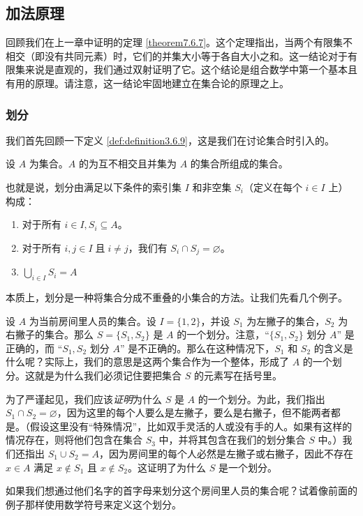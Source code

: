 
\subsection{加法原理}

回顾我们在上一章中证明的定理 \ref{theorem7.6.7}。这个定理指出，当两个有限集不相交（即没有共同元素）时，它们的并集大小等于各自大小之和。这一结论对于有限集来说是直观的，我们通过双射证明了它。这个结论是组合数学中第一个基本且有用的原理。请注意，这一结论牢固地建立在集合论的原理之上。

\subsubsection*{划分}

我们首先回顾一下定义 \ref{def:definition3.6.9}，这是我们在讨论集合时引入的。

\begin{definition}
    设 $A$ 为集合。$A$ 的为互不相交且并集为 $A$ 的集合所组成的集合。

    也就是说，划分由满足以下条件的索引集 $I$ 和非空集 $S_i$（定义在每个 $i \in I$ 上）构成：
    \begin{enumerate}[label=(\arabic*)]
        \item 对于所有 $i \in I, S_i \subseteq A$。
        \item 对于所有 $i, j \in I \;\text{且}\; i \ne j$，我们有 $S_i \cap S_j = \varnothing$。
        \item $\displaystyle \bigcup_{i \in I} S_i = A$
    \end{enumerate}
\end{definition}
本质上，划分是一种将集合分成不重叠的小集合的方法。让我们先看几个例子。\\

\begin{example}
    设 $A$ 为当前房间里人员的集合。设 $I = \{1, 2\}$，并设 $S_1$ 为左撇子的集合，$S_2$ 为右撇子的集合。那么 $S = \{S_1, S_2\}$ 是 $A$ 的一个划分。注意，``$\{S_1, S_2\}$ 划分 $A$'' 是正确的，而 ``$S_1, S_2$ 划分 $A$'' 是不正确的。那么在这种情况下，$S_1$ 和 $S_2$ 的含义是什么呢？实际上，我们的意思是这两个集合作为一个整体，形成了 $A$ 的一个划分。这就是为什么我们必须记住要把集合 $S$ 的元素写在括号里。

    为了严谨起见，我们应该\emph{证明}为什么 $S$ 是 $A$ 的一个划分。为此，我们指出 $S_1 \cap S_2 = \varnothing$，因为这里的每个人要么是左撇子，要么是右撇子，但不能两者都是。（假设这里没有``特殊情况''，比如双手灵活的人或没有手的人。如果有这样的情况存在，则将他们包含在集合 $S_3$ 中，并将其包含在我们的划分集合 $S$ 中。）我们还指出 $S_1 \cup S_2 = A$，因为房间里的每个人必然是左撇子或右撇子，因此不存在 $x \in A$ 满足 $x \notin S_1$ 且 $x \notin S_2$。这证明了为什么 $S$ 是一个划分。

    如果我们想通过他们名字的首字母来划分这个房间里人员的集合呢？试着像前面的例子那样使用数学符号来定义这个划分。
\end{example}

